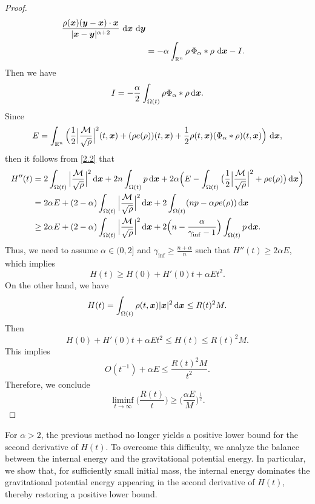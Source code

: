 \documentclass[reqno,11pt]{amsart}
\numberwithin{equation}{section}
\theoremstyle{definition}
\def\dd{{\, \rm d}}
\begin{document}
\begin{proof}
\begin{align*}
\frac{\rho(\boldsymbol{x})(\boldsymbol{y}-\boldsymbol{x})\cdot \boldsymbol{x}}
{|\boldsymbol{x}-\boldsymbol{y}|^{\alpha+2}}
\,\dd \boldsymbol{x}\,\dd \boldsymbol{y}\\
&=-\alpha\int_{\mathbb{R}^n}\rho\,\Phi_\alpha\ast\rho\,\dd \boldsymbol{x}-I.
 \end{align*}
 Then we have 
 $$
 I=-\frac{\alpha}{2}\int_{\Omega(t)}\rho\Phi_\alpha\ast\rho\dd \boldsymbol{x}.
 $$
 Since
 $$
 E=\int_{\mathbb{R}^n}\Big( \frac{1}{2} \Big|\frac{\mathcal{M}}{\sqrt{\rho}}\Big|^2(t,\boldsymbol{x})
 + (\rho e(\rho))(t,\boldsymbol{x}) + \frac{1}{2}\rho(t,\boldsymbol{x})(\Phi_\alpha \ast \rho)(t,\boldsymbol{x})\Big)\,\dd\boldsymbol{x},
 $$
 then it follows from \eqref{2.2} that
 \begin{align*}
 \begin{split}
 H''(t)& =2\int_{\Omega(t)}\Big| \frac{\mathcal{M}}{\sqrt{\rho}} \Big|^2\dd \boldsymbol{x}
 +2n\int_{\Omega(t)}p\dd \boldsymbol{x}+2\alpha\Big(E-\int_{\Omega(t)}\big(\frac{1}{2}\Big | \frac{\mathcal{M}}{\sqrt{\rho}} \Big |^2+\rho e(\rho)\big)\dd \boldsymbol{x}\Big) \\
 & = 2\alpha E + (2-\alpha)\int_{\Omega(t)}\Big| \frac{\mathcal{M}}{\sqrt{\rho}} \Big|^2\dd \boldsymbol{x} 
 + 2\int_{\Omega(t)}(np - \alpha \rho e(\rho))\dd \boldsymbol{x} \\
 & \geq 2\alpha E + (2-\alpha)\int_{\Omega(t)}\Big| \frac{\mathcal{M}}{\sqrt{\rho}} \Big|^2\dd \boldsymbol{x} 
 + 2 \Big(n-\frac{\alpha}{\gamma_{\inf} - 1} \Big)\int_{\Omega(t)}p\dd \boldsymbol{x}.
 \end{split}
 \end{align*}
 Thus, we need to assume $\alpha\in(0,2]$ and $\gamma_{\inf} \geq \frac{n + \alpha}{n}$ 
 such that $H''(t)\geq 2\alpha E$, which implies
 $$
 H(t)\geq H(0)+H'(0)t+\alpha E t^2.
 $$
 On the other hand, we have
 $$
H(t)=\int_{\Omega(t)}\rho(t,\boldsymbol{x})|\boldsymbol{x}|^2\dd \boldsymbol{x}\leq R(t)^2M.
 $$
 Then 
 $$
 H(0)+H'(0)t+\alpha Et^2\leq H(t)\leq R(t)^2M.
 $$
 This implies 
 $$
 O(t^{-1})+\alpha E\leq \frac{R(t)^2M}{t^2}.
 $$
 Therefore, we conclude
 $$
 \liminf_{t\rightarrow\infty}\Big(\frac{R(t)}{t}\Big)\geq\Big(\frac{\alpha E}{M}\Big)^{\frac{1}{2}}.
 $$
\end{proof}

For $\alpha > 2$, the previous method no longer yields a positive lower bound 
for the second derivative of $H(t)$. 
To overcome this difficulty, we analyze the balance between the internal energy and the gravitational potential energy. In particular, we show that, for sufficiently small initial mass, 
the internal energy dominates the gravitational potential energy appearing in the second derivative of 
$H(t)$, thereby restoring a positive lower bound.
\end{document}
